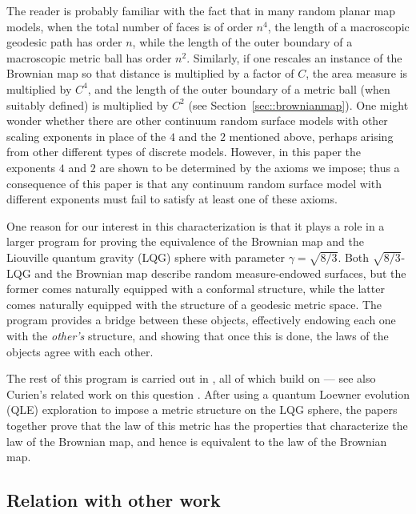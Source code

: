 \documentclass[JEP,XML,SOM,Unicode]{cedram}
\theoremstyle{plain}
\numberwithin{theorem}{section}
\theoremstyle{definition}
\begin{document}
The reader is probably familiar with the fact that in many random planar map models, when the total number of faces is of order $n^4$, the length of a macroscopic geodesic path has order $n$, while the length of the outer boundary of a macroscopic metric ball has order $n^2$. Similarly, if one rescales an instance of the Brownian map so that distance is multiplied by a factor of $C$, the area measure is multiplied by $C^4$, and the length of the outer boundary of a metric ball (when suitably defined) is multiplied by $C^2$ (see Section~\ref{sec::brownianmap}). One might wonder whether there are other continuum random surface models with other scaling exponents in place of the $4$ and the $2$ mentioned above, perhaps arising from other different types of discrete models. However, in this paper the exponents $4$ and $2$ are shown to be determined by the axioms we impose; thus a consequence of this paper is that any continuum random surface model with different exponents must fail to satisfy at least one of these axioms.

One reason for our interest in this characterization is that it plays a role in a larger program for proving the equivalence of the Brownian map and the Liouville quantum gravity (LQG) sphere with parameter $\gamma = \sqrt{8/3}$. Both $\sqrt{8/3}$-LQG and the Brownian map describe random measure-endowed surfaces, but the former comes naturally equipped with a conformal structure, while the latter comes naturally equipped with the structure of a geodesic metric space. The program provides a bridge between these objects, effectively endowing each one with the \emph{other's} structure, and showing that once this is done, the laws of the objects agree with each other.

The rest of this program is carried out in \cite{qlebm,quantum_spheres,qle_continuity, qle_determined}, all of which build on \cite{she2010zipper, ms2012imag1, ms2012imag2, ms2012imag3, ms2013imag4, ms2013qle, matingtrees} --- see also Curien's related work on this question \cite{cur2013glimpse}. After using a quantum Loewner evolution (QLE) exploration to impose a metric structure on the LQG sphere, the papers \cite{qlebm, qle_continuity} together prove that the law of this metric has the properties that characterize the law of the Brownian map, and hence is equivalent to the law of the Brownian map.\enlargethispage{\baselineskip}%

\subsection{Relation with other work}
\end{document}

